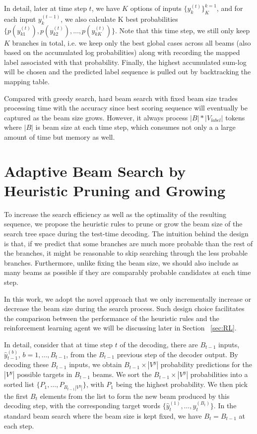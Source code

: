 \documentclass[11pt,a4paper]{article}
\begin{document}
In detail, later at time step $t$, we have $K$ options of inputs $\{ y^{(t)}_k\}^{k=1}_K$, and for each input $y^{(t-1)}_{k}$, we also calculate K best probabilities $\{ p({y}^{(t)}_{k1}), p({y}^{(t)}_{k2}), \dots, p({y}^{(t)}_{kK}) \}$. Note that this time step, we still only keep $K$ branches in total, i.e. we keep only the best global cases across all beams (also based on the accumulated log probabilities) along with recording the mapped label associated with that probability. Finally, the highest accumulated sum-log will be chosen and the predicted label sequence is pulled out by backtracking the mapping table. 

Compared with greedy search, hard beam search with fixed beam size trades processing time with the accuracy since best scoring sequence will eventually be captured as the beam size grows. However, it always process $|B| * |V_{label}|$ tokens where $|B|$ is beam size at each time step, which consumes not only a a large amount of time but memory as well. 


\section{Adaptive Beam Search by Heuristic Pruning and Growing}
\label{sec:Heuristic}

To increase the search efficiency as well as the optimality of the resulting sequence, we propose the heuristic rules to prune or grow the beam size of the search tree space during the test-time decoding. The intuition behind the design is that, if we predict that some branches are much more probable than the rest of the branches, it might be reasonable to skip searching through the less probable branches. Furthermore, unlike fixing the beam size, we should also include as many beams as possible if they are comparably probable candidates at each time step.

In this work, we adopt the novel approach that we only incrementally increase or decrease the beam size during the search process. Such design choice facilitates the comparison between the performance of the heuristic rules and the reinforcement learning agent we will be discussing later in Section ~\ref{sec:RL}.

In detail, consider that at time step $t$ of the decoding, there are $B_{t-1}$ inputs, $\hat{y}_{t-1}^{(b)}$, $b = 1, \dots, B_{t-1}$, from the $B_{t-1}$ previous step of the decoder output. By decoding these $B_{t-1}$ inputs, we obtain $B_{t-1} \times |V^y|$ probability predictions for the $|V^y|$ possible targets in $B_{t-1}$ beams. We sort the $B_{t-1} \times |V^y|$ probabilities into a sorted list $\{ P_1, \dots, P_{B_{t-1} |V^y|} \}$, with $P_1$ being the highest probability. We then pick the first $B_t$ elements from the list to form the new beam produced by this decoding step, with the corresponding target words $\{ \hat{y}_{t}^{(1)}, \dots, \hat{y}_{t}^{(B_t)} \}$. In the standard beam search where the beam size is kept fixed, we have $B_t = B_{t-1}$ at each step.
\end{document}
